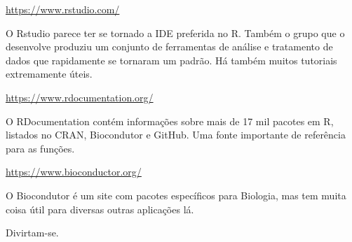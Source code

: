\documentclass[12pt,a4paper,oneside]{erdc}
\begin{document}
\url{https://www.rstudio.com/}

O Rstudio parece ter se tornado a IDE preferida no R. Também o grupo que o desenvolve produziu um conjunto de ferramentas de análise e tratamento de dados que rapidamente se tornaram um padrão. Há também muitos tutoriais extremamente úteis. 


\url{https://www.rdocumentation.org/}

O RDocumentation contém informações sobre mais de 17 mil pacotes em R, listados no CRAN, Biocondutor e GitHub. Uma fonte importante de referência para as funções. 


\url{https://www.bioconductor.org/} 

O Biocondutor é um site com pacotes específicos para Biologia, mas tem muita coisa útil para diversas outras aplicações lá.



\bigskip

Divirtam-se.

  


%


\end{document}
